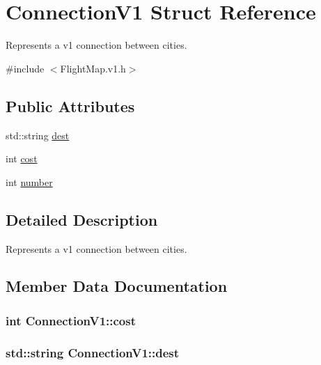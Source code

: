 \hypertarget{struct_connection_v1}{}\section{Connection\+V1 Struct Reference}
\label{struct_connection_v1}


Represents a v1 connection between cities.  




{\ttfamily \#include $<$Flight\+Map.\+v1.\+h$>$}

\subsection*{Public Attributes}
\begin{DoxyCompactItemize}
\item 
std\+::string \hyperlink{struct_connection_v1_ac1772f5120bffaeb9611678a832d7aa6}{dest}
\item 
int \hyperlink{struct_connection_v1_a3bccc9d101c81b82e8fd6ea5bd3a1288}{cost}
\item 
int \hyperlink{struct_connection_v1_aae89534b17174667d7e92d5444dfceab}{number}
\end{DoxyCompactItemize}


\subsection{Detailed Description}
Represents a v1 connection between cities. 

\subsection{Member Data Documentation}
\subsubsection[{\texorpdfstring{cost}{cost}}]{\setlength{\rightskip}{0pt plus 5cm}int Connection\+V1\+::cost}\hypertarget{struct_connection_v1_a3bccc9d101c81b82e8fd6ea5bd3a1288}{}\label{struct_connection_v1_a3bccc9d101c81b82e8fd6ea5bd3a1288}
\subsubsection[{\texorpdfstring{dest}{dest}}]{\setlength{\rightskip}{0pt plus 5cm}std\+::string Connection\+V1\+::dest}\hypertarget{struct_connection_v1_ac1772f5120bffaeb9611678a832d7aa6}{}\label{struct_connection_v1_ac1772f5120bffaeb9611678a832d7aa6}
